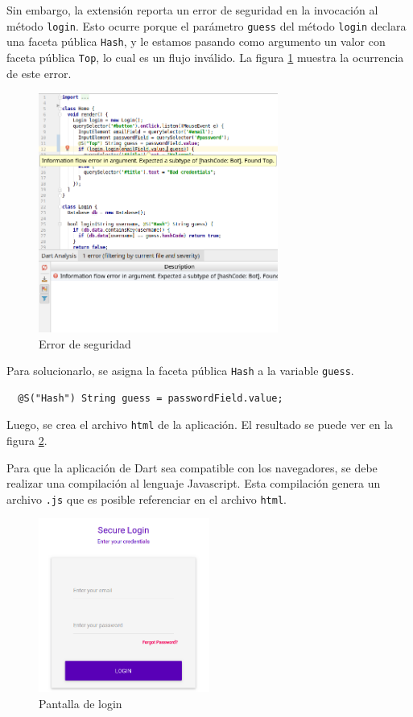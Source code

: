 Sin embargo, la extensión reporta un error de seguridad en la invocación al método \texttt{login}. Esto ocurre porque el parámetro \texttt{guess} del método \texttt{login} declara una faceta pública \texttt{Hash}, y le estamos pasando como argumento un valor con faceta pública \texttt{Top}, lo cual es un flujo inválido. La figura \ref{screen3} muestra la ocurrencia de este error.
\clearpage
\begin{figure}[ht]
  \centering
  \includegraphics[width=0.7\textwidth]{imagenes/screen3.png}
  \caption{Error de seguridad}
  \label{screen3}
\end{figure}

Para solucionarlo, se asigna la faceta pública \texttt{Hash} a la variable \texttt{guess}.
\vspace{0.5em}
\begin{lstlisting}
  @S("Hash") String guess = passwordField.value;
\end{lstlisting}

 Luego, se crea el archivo \texttt{html} de la aplicación. El resultado se puede ver en la figura \ref{screen4}.

Para que la aplicación de Dart sea compatible con los navegadores, se debe realizar una compilación al lenguaje Javascript. Esta compilación genera un archivo \texttt{.js} que es posible referenciar en el archivo \texttt{html}.
\clearpage
 \begin{figure}[ht]
   \centering
   \includegraphics[width=0.5\textwidth]{imagenes/screen4.png}
   \caption{Pantalla de login}
   \label{screen4}
 \end{figure}


